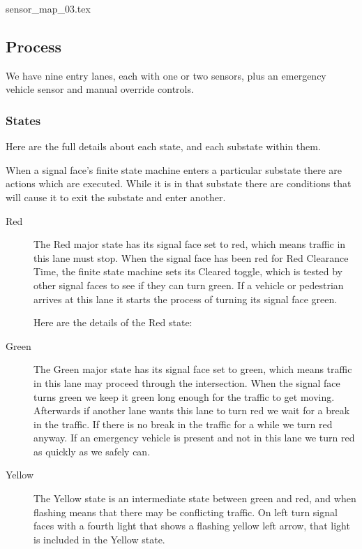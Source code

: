 \documentclass[letterpaper,twoside]{article}
\begin{document}
 {sensor_map_03.tex}

\subsection{Process}

We have nine entry lanes, each with one or two sensors, plus an emergency
vehicle sensor and manual override controls.

\subsubsection{States}

Here are the full details about each state, and each substate within them.

When a signal face's finite state machine enters a particular substate
there are actions which are executed.
While it is in that substate there are conditions
that will cause it to exit the substate and enter another.

\begin{description}

\item[Red]
  The Red major state has its signal face set to red,
  which means traffic in this
  lane must stop.  When the signal face has been red for Red Clearance Time,
  the finite state machine sets its Cleared toggle, which is tested by other
  signal faces to see if they can turn green.  If a vehicle or
  pedestrian arrives at this lane it starts the process
  of turning its signal face green.

  Here are the details of the Red state:
      
  
  
\item[Green]
  The Green major state has its signal face set to green,
  which means traffic in this lane
  may proceed through the intersection.
  When the signal face turns green
  we keep it green long enough
  for the traffic to get moving.  Afterwards if another lane
  wants this lane to turn red we wait for a break in the traffic.
  If there is no break in the
  traffic for a while we turn red anyway.
  If an emergency vehicle is present and not in this lane
  we turn red as quickly as we safely can.

  

\item[Yellow]
  The Yellow state is an intermediate state between green and red, and when
  flashing means that there may be conflicting traffic.  On left turn signal
  faces with a fourth light that shows a flashing yellow left arrow, that
  light is included in the Yellow state.

  
  
\end{description}
\end{document}
